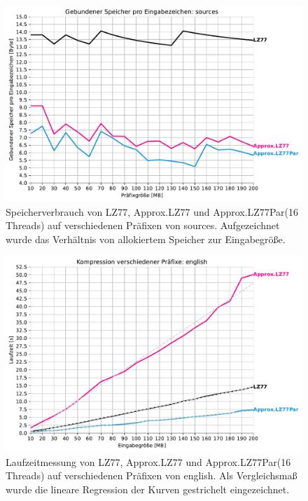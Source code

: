 \begin{figure}[H]
    \centering
    \caption{Speicherverbrauch von LZ77, Approx.LZ77 und Approx.LZ77Par(16 Threads) auf verschiedenen Präfixen von sources. Aufgezeichnet wurde das Verhältnis
    von allokiertem Speicher zur Eingabegröße.}
    \includegraphics[scale=0.65]{Images/progressive_mem_sources.pdf}
\end{figure}

\begin{figure}[H]
    \centering
    \caption{Laufzeitmessung von LZ77, Approx.LZ77 und Approx.LZ77Par(16 Threads) auf verschiedenen Präfixen von english. Als Vergleichsmaß wurde 
    die lineare Regression der Kurven gestrichelt eingezeichnet.}
    \includegraphics[scale=0.68]{Images/progressive_english.pdf}
\end{figure}

